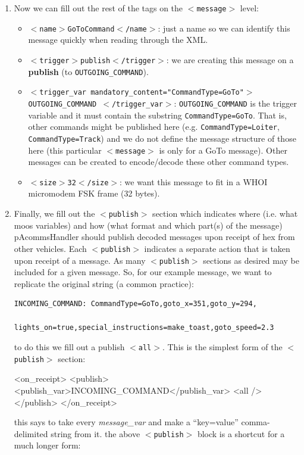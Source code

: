 \documentclass[11pt, letterpaper, oneside]{memoir}
\newcommand{\xmltag}[1]{\texttt{$<$#1$>$}}
\begin{document}
\begin{enumerate}
\item Now we can fill out the rest of the tags on the \xmltag{message} level:
\begin{itemize}
\item \xmltag{name$>$GoToCommand$<$/name}: just a name so we can identify this message quickly when reading through the XML.
\item \xmltag{trigger$>$publish$<$/trigger}: we are creating this message on a \textbf{publish} (to \verb|OUTGOING_COMMAND|).
\item \xmltag{trigger\_var mandatory\_content="CommandType=GoTo"$>$ OUTGOING\_COMMAND $<$/trigger\_var}: \verb|OUTGOING_COMMAND| is the trigger variable and it must contain the substring \verb|CommandType=GoTo|. That is, other commands might be published here (e.g. \verb|CommandType=Loiter|, \verb|CommandType=Track|) and we do not define the message structure of those here (this particular \xmltag{message} is only for a GoTo message). Other messages can be created to encode/decode these other command types.
\item \xmltag{size$>$32$<$/size}: we want this message to fit in a WHOI micromodem FSK frame (32 bytes).
\end{itemize}
\item Finally, we fill out the \xmltag{publish} section which indicates where (i.e. what moos variables) and how (what format and which part(s) of the message) pAcommsHandler should publish decoded messages upon receipt of hex from other vehicles. Each \xmltag{publish} indicates a separate action that is taken upon receipt of a message. As many \xmltag{publish} sections as desired may be included for a given message. So, for our example message, we want to replicate the original string (a common practice):
\begin{verbatim}
INCOMING_COMMAND: CommandType=GoTo,goto_x=351,goto_y=294,
                  lights_on=true,special_instructions=make_toast,goto_speed=2.3
\end{verbatim}
to do this we fill out a publish \xmltag{all}. This is the simplest form of the \xmltag{publish} section:
\begin{small}
\begin{boxedverbatim}
    <on_receipt>
      <publish>
        <publish_var>INCOMING_COMMAND</publish_var>
        <all />
      </publish>
    </on_receipt>
\end{boxedverbatim}
\resetbvlinenumber
\end{small}
this says to take every \textit{message\_var} and make a ``key=value'' comma-delimited string from it. the above \xmltag{publish} block is a shortcut for a much longer form:

\end{enumerate}
\end{document}
